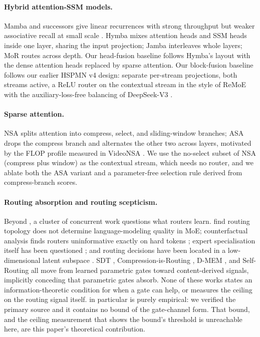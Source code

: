 \documentclass[11pt,a4paper]{article}
\begin{document}
\paragraph{Hybrid attention-SSM models.} Mamba and successors give linear
recurrences with strong throughput but weaker associative recall at small
scale \citep{mamba2,mamba3,rwkv7,gateddeltanet}. Hymba \citep{hymba} mixes
attention heads and SSM heads inside one layer, sharing the input
projection; Jamba \citep{jamba} interleaves whole layers; MoR \citep{mor}
routes across depth. Our head-fusion baseline follows Hymba's layout with
the dense attention heads replaced by sparse attention. Our block-fusion
baseline follows our earlier HSPMN v4 design: separate per-stream
projections, both streams active, a ReLU router on the contextual stream
in the style of ReMoE \citep{remoe} with the auxiliary-loss-free balancing
of DeepSeek-V3 \citep{deepseekv3}.

\paragraph{Sparse attention.} NSA \citep{nsa} splits attention into
compress, select, and sliding-window branches; ASA \citep{asa} drops the
compress branch and alternates the other two across layers, motivated by
the FLOP profile measured in VideoNSA \citep{videonsa}. We use the
no-select subset of NSA (compress plus window) as the contextual stream,
which needs no router, and we ablate both the ASA variant and a
parameter-free selection rule derived from compress-branch scores.

\paragraph{Routing absorption and routing scepticism.} Beyond
\citet{absorption2026}, a cluster of concurrent work questions what
routers learn. \citet{equifinality} find routing topology does not
determine language-modeling quality in MoE; counterfactual analysis finds
routers uninformative exactly on hard tokens \citep{counterfactual2026};
expert specialisation itself has been questioned \citep{mythspec2026};
and routing decisions have been located in a low-dimensional latent
subspace \citep{routingparadox2026}. SDT \citep{sdt},
Compression-is-Routing \citep{cir}, D-MEM \citep{dmem}, and Self-Routing
\citep{selfrouting} all move from learned parametric gates toward
content-derived signals, implicitly conceding that parametric gates
absorb. None of these works states an information-theoretic condition for
when a gate can help, or measures the ceiling on the routing signal
itself. \citet{absorption2026} in particular is purely empirical: we
verified the primary source and it contains no bound of the
gate-channel form. That bound, and the ceiling measurement that shows the
bound's threshold is unreachable here, are this paper's theoretical
contribution.
\end{document}
